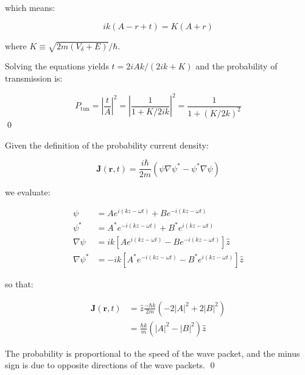 \documentclass[12pt]{article}
\begin{document}
which means:

\begin{equation}
    ik(A - r + t) = K (A + r)
\end{equation}

where $K \equiv \sqrt{2m(V_{\delta} + E)}/\hbar$.

Solving the equations yields $t = 2iAk/(2ik + K)$ and the probability of transmission is:

\begin{equation}
    P_{\text{tun}} = \left\lvert \frac{t}{A} \right\rvert^{2} = \left\lvert \frac{1}{1 + K/2ik} \right\rvert^{2} = \frac{1}{1 + (K/2k)^{2}}
\end{equation}
\qed


Given the definition of the probability current density:

\begin{equation}
    \mathbf{J}(\mathbf{r}, t) = \frac{i\hbar}{2m} \left( \psi \nabla \psi^{*} - \psi^{*} \nabla \psi \right)
\end{equation}

we evaluate:

\begin{equation}
    \begin{split}
        \psi &= A e^{i(kz - \omega t)} + B e^{-i(kz - \omega t)} \\
        \psi^{*} &= A^{*} e^{-i(kz - \omega t)} + B^{*} e^{i(kz - \omega t)} \\
        \nabla \psi &= ik \left[ A e^{i(kz - \omega t)} - B e^{-i(kz - \omega t)} \right] \hat{z} \\
        \nabla \psi^{*} &= -ik \left[ A^{*} e^{-i(kz - \omega t)} - B^{*} e^{i(kz - \omega t)} \right] \hat{z}
    \end{split}
\end{equation}

so that:

\begin{equation}
    \begin{split}
        \mathbf{J}(\mathbf{r}, t) &= \hat{z} \frac{-\hbar k}{2m} \left( -2\left\lvert A \right\rvert^{2} + 2\left\lvert B \right\rvert^{2} \right) \\
        &= \frac{\hbar k}{m} \left( \left\lvert A \right\rvert^{2} - \left\lvert B \right\rvert^{2} \right) \hat{z}
    \end{split}
\end{equation}

The probability is proportional to the speed of the wave packet, and the minus sign is due to opposite directions of the wave packets.
\qed
\end{document}
